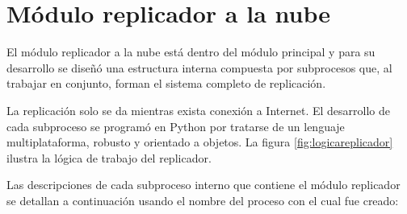 \section{Módulo replicador a la nube}

El módulo replicador a la nube está dentro del módulo principal y para su desarrollo se diseñó una estructura interna compuesta por subprocesos que, al trabajar en conjunto, forman el sistema completo de replicación.

La replicación solo se da mientras exista conexión a Internet. El desarrollo de cada subproceso se programó en Python por tratarse de un lenguaje multiplataforma, robusto y orientado a objetos. La figura \ref{fig:logicareplicador} ilustra la lógica de trabajo del replicador.





Las descripciones de cada subproceso interno que contiene el módulo replicador se detallan a continuación usando el nombre del proceso con el cual fue creado: 

